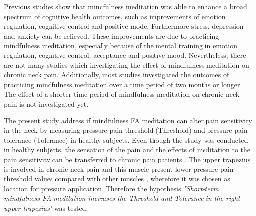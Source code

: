 Previous studies show that mindfulness meditation was able to enhance a broad spectrum of cognitive health outcomes, such as improvements of emotion regulation, cognitive control and positive mode. Furthermore stress, depression and anxiety can be relieved. These improvements are due to practicing mindfulness meditation, especially because of the mental training in emotion regulation, cognitive control, acceptance and positive mood. \cite{marcus2009,Zeidan2012, Zeidan2016} Nevertheless, there are not many studies which investigating the effect of mindfulness meditation on chronic neck pain. \cite{Macfarlanea2016} Additionally, most studies investigated the outcomes of practicing mindfulness meditation over a time period of two months or longer. The effect of a shorter time period of mindfulness meditation on chronic neck pain is not investigated yet. 


The present study address if mindfulness FA meditation can alter pain sensitivity in the neck by measuring pressure pain threshold (Threshold) and pressure pain tolerance (Tolerance) in healthy subjects. Even though the study was conducted in healthy subjects, the sensation of the pain and the effects of meditation to the pain sensitivity can be transferred to chronic pain patients \cite{Kjogx2016}. The upper trapezius is involved in chronic neck pain and this muscle present lower pressure pain threshold values compared with other muscles \cite{Fischer1987, Falla2004}, wherefore it was chosen as location for pressure application.
Therefore the hypothesis \textit{"Short-term mindfulness FA meditation increases the Threshold and Tolerance in the right upper trapezius"} was tested.

